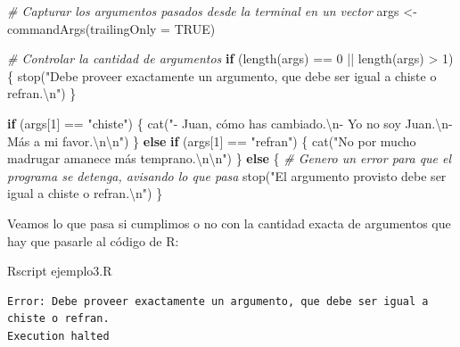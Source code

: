 \documentclass[
]{book}
\newenvironment{Shaded}{\begin{snugshade}}{\end{snugshade}}
\newcommand{\AttributeTok}[1]{\textcolor[rgb]{0.77,0.63,0.00}{#1}}
\newcommand{\CommentTok}[1]{\textcolor[rgb]{0.56,0.35,0.01}{\textit{#1}}}
\newcommand{\ConstantTok}[1]{\textcolor[rgb]{0.00,0.00,0.00}{#1}}
\newcommand{\ControlFlowTok}[1]{\textcolor[rgb]{0.13,0.29,0.53}{\textbf{#1}}}
\newcommand{\DecValTok}[1]{\textcolor[rgb]{0.00,0.00,0.81}{#1}}
\newcommand{\ExtensionTok}[1]{#1}
\newcommand{\FunctionTok}[1]{\textcolor[rgb]{0.00,0.00,0.00}{#1}}
\newcommand{\NormalTok}[1]{#1}
\newcommand{\OtherTok}[1]{\textcolor[rgb]{0.56,0.35,0.01}{#1}}
\newcommand{\SpecialCharTok}[1]{\textcolor[rgb]{0.00,0.00,0.00}{#1}}
\newcommand{\StringTok}[1]{\textcolor[rgb]{0.31,0.60,0.02}{#1}}
\begin{document}
\begin{Shaded}
\begin{Highlighting}[]
\CommentTok{\# Capturar los argumentos pasados desde la terminal en un vector}
\NormalTok{args }\OtherTok{\textless{}{-}} \FunctionTok{commandArgs}\NormalTok{(}\AttributeTok{trailingOnly =} \ConstantTok{TRUE}\NormalTok{)}

\CommentTok{\# Controlar la cantidad de argumentos}
\ControlFlowTok{if}\NormalTok{ (}\FunctionTok{length}\NormalTok{(args) }\SpecialCharTok{==} \DecValTok{0} \SpecialCharTok{||} \FunctionTok{length}\NormalTok{(args) }\SpecialCharTok{\textgreater{}} \DecValTok{1}\NormalTok{) \{}
    \FunctionTok{stop}\NormalTok{(}\StringTok{"Debe proveer exactamente un argumento, que debe ser igual a chiste o refran.}\SpecialCharTok{\textbackslash{}n}\StringTok{"}\NormalTok{)}
\NormalTok{\}}

\ControlFlowTok{if}\NormalTok{ (args[}\DecValTok{1}\NormalTok{] }\SpecialCharTok{==} \StringTok{"chiste"}\NormalTok{) \{}
    \FunctionTok{cat}\NormalTok{(}\StringTok{"{-} Juan, cómo has cambiado.}\SpecialCharTok{\textbackslash{}n}\StringTok{{-} Yo no soy Juan.}\SpecialCharTok{\textbackslash{}n}\StringTok{{-} Más a mi favor.}\SpecialCharTok{\textbackslash{}n\textbackslash{}n}\StringTok{"}\NormalTok{)}
\NormalTok{\} }\ControlFlowTok{else} \ControlFlowTok{if}\NormalTok{ (args[}\DecValTok{1}\NormalTok{] }\SpecialCharTok{==} \StringTok{"refran"}\NormalTok{) \{}
    \FunctionTok{cat}\NormalTok{(}\StringTok{"No por mucho madrugar amanece más temprano.}\SpecialCharTok{\textbackslash{}n\textbackslash{}n}\StringTok{"}\NormalTok{)}
\NormalTok{\} }\ControlFlowTok{else}\NormalTok{ \{}
    \CommentTok{\# Genero un error para que el programa se detenga, avisando lo que pasa}
    \FunctionTok{stop}\NormalTok{(}\StringTok{"El argumento provisto debe ser igual a chiste o refran.}\SpecialCharTok{\textbackslash{}n}\StringTok{"}\NormalTok{)}
\NormalTok{\}}
\end{Highlighting}
\end{Shaded}

Veamos lo que pasa si cumplimos o no con la cantidad exacta de argumentos que hay que pasarle al código de R:

\begin{Shaded}
\begin{Highlighting}[]
\ExtensionTok{Rscript}\NormalTok{ ejemplo3.R}
\end{Highlighting}
\end{Shaded}

\begin{verbatim}
Error: Debe proveer exactamente un argumento, que debe ser igual a chiste o refran.
Execution halted
\end{verbatim}
\end{document}
